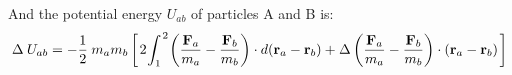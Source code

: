 \documentclass[10pt]{article}
\newcommand{\mM}{m}
\newcommand{\mU}{U}
\newcommand{\ra}{_a}
\newcommand{\rb}{_b}
\newcommand{\rab}{_{ab}}
\newcommand{\vR}{\mathbf{r}}
\newcommand{\vF}{\mathbf{F}}
\begin{document}
\vspace{-0.60em}
\medskip
\par And the potential energy $\mU\rab$ of particles A and B is:
\vspace{+0.30em}
{\fontsize{8}{8}\selectfont\begin{eqnarray*}
\Delta \hspace{+0.24em} \mU\rab = - \frac{1}{2} \hspace{+0.24em} \mM\ra\mM\rb \left[ \hspace{+0.12em} 2 \hspace{-0.12em} \int_1^{\hspace{+0.09em} 2} \hspace{-0.12em} \left(\frac{\vF\ra}{\mM\ra} - \frac{\vF\rb}{\mM\rb}\right) \cdot d(\vR\ra - \vR\rb) + \hspace{+0.03em} \Delta \left(\frac{\vF\ra}{\mM\ra} - \frac{\vF\rb}{\mM\rb}\right) \cdot (\vR\ra - \vR\rb) \hspace{+0.12em} \right]
\end{eqnarray*}}
\end{document}
